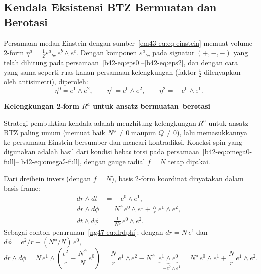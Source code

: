 \subsection{Kendala Eksistensi BTZ Bermuatan dan Berotasi}
\label{sec:b4-kendala}

Persamaan medan Einstein dengan sumber~\eqref{em43-eq:eq-einstein}\label{mx45-eq:einstein-charged} memuat volume 2-form $\eta^a = \tfrac{1}{2}\varepsilon^a{}_{bc}\,e^b \wedge e^c$. Dengan komponen $\varepsilon^a{}_{bc}$ pada signatur $(+,-,-)$ yang telah dihitung pada persamaan~\eqref{b42-eq:eps0}--\eqref{b42-eq:eps2}, dan dengan cara yang sama seperti ruas kanan persamaan kelengkungan (faktor $\tfrac{1}{2}$ dilenyapkan oleh antisimetri), diperoleh:
\begin{equation}\label{ng47-eq:eta-summary}
    \eta^0 = e^1 \wedge e^2, \qquad
    \eta^1 = e^0 \wedge e^2, \qquad
    \eta^2 = -\,e^0 \wedge e^1.
\end{equation}

\vspace{0.5em}
\noindent \textbf{Kelengkungan 2-form $R^a$ untuk ansatz bermuatan--berotasi}

Strategi pembuktian kendala adalah menghitung kelengkungan $R^a$ untuk ansatz BTZ paling umum (memuat baik $N^\phi \neq 0$ maupun $Q \neq 0$), lalu memasukkannya ke persamaan Einstein bersumber dan mencari kontradiksi. Koneksi spin yang digunakan adalah hasil dari kondisi bebas torsi pada persamaan~\eqref{b42-eq:omega0-full}--\eqref{b42-eq:omega2-full}, dengan gauge radial $f = N$ tetap dipakai.

Dari dreibein invers (dengan $f = N$), basis 2-form koordinat dinyatakan dalam basis frame:
\begin{align}
    dr \wedge dt &= -\,e^0 \wedge e^1, \label{ng47-eq:drdt}\\[3pt]
    dr \wedge d\phi &= N^\phi\,e^0 \wedge e^1 + \frac{N}{r}\,e^1 \wedge e^2, \label{ng47-eq:drdphi}\\[3pt]
    dt \wedge d\phi &= \frac{1}{Nr}\,e^0 \wedge e^2. \label{ng47-eq:dtdphi}
\end{align}
Sebagai contoh penurunan~\eqref{ng47-eq:drdphi}: dengan $dr = N\,e^1$ dan $d\phi = e^2/r - (N^\phi/N)\,e^0$,
\begin{equation}
    dr \wedge d\phi = N\,e^1 \wedge\!\left(\frac{e^2}{r} - \frac{N^\phi}{N}\,e^0\right)
    = \frac{N}{r}\,e^1 \wedge e^2 - N^\phi\,\underbrace{e^1 \wedge e^0}_{=-e^0 \wedge e^1}
    = N^\phi\,e^0 \wedge e^1 + \frac{N}{r}\,e^1 \wedge e^2.
\end{equation}

